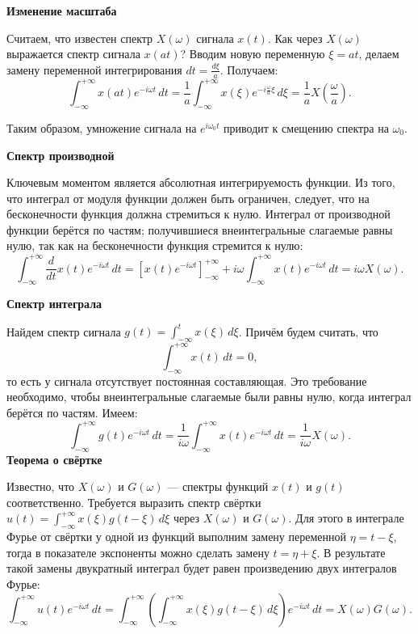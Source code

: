 {\textbf{ Изменение масштаба }

Считаем, что известен спектр \( X(\omega) \) сигнала \( x(t) \). Как через \( X(\omega) \) выражается спектр сигнала \( x(at) \)? Вводим новую переменную \( \xi = at \), делаем замену переменной интегрирования \( dt = \frac{d\xi}{a} \). Получаем:
\[
\int_{-\infty}^{+\infty} x(at) e^{-i \omega t} \, dt = \frac{1}{a} \int_{-\infty}^{+\infty} x(\xi) e^{-i \frac{\omega}{a} \xi} \, d\xi = \frac{1}{a} X\left( \frac{\omega}{a} \right). \tag{2.31}
\]





Таким образом, умножение сигнала на \( e^{i \omega_0 t} \) приводит к смещению спектра на \( \omega_0 \).

\textbf{ Спектр производной }

Ключевым моментом является абсолютная интегрируемость функции. Из того, что интеграл от модуля функции должен быть ограничен, следует, что на бесконечности функция должна стремиться к нулю. Интеграл от производной функции берётся по частям; получившиеся внеинтегральные слагаемые равны нулю, так как на бесконечности функция стремится к нулю:
\[
\int_{-\infty}^{+\infty} \frac{d}{dt} x(t) e^{-i \omega t} \, dt = \left[ x(t) e^{-i \omega t} \right]_{-\infty}^{+\infty} + i \omega \int_{-\infty}^{+\infty} x(t) e^{-i \omega t} \, dt = i \omega X(\omega). \tag{2.32}
\]

\textbf{Спектр интеграла}

Найдем спектр сигнала \( g(t) = \int_{-\infty}^{t} x(\xi) \, d\xi \). Причём будем считать, что
\[
\int_{-\infty}^{+\infty} x(t) \, dt = 0, \tag{2.33}
\]
то есть у сигнала отсутствует постоянная составляющая. Это требование необходимо, чтобы внеинтегральные слагаемые были равны нулю, когда интеграл берётся по частям. Имеем:
\[
\int_{-\infty}^{+\infty} g(t) e^{-i \omega t} \, dt = \frac{1}{i \omega} \int_{-\infty}^{+\infty} x(t) e^{-i \omega t} \, dt = \frac{1}{i \omega} X(\omega).  \tag{2.34}
\]
\newpage 
\textbf{Теорема о свёртке}

Известно, что \( X(\omega) \) и \( G(\omega) \) — спектры функций \( x(t) \) и \( g(t) \) соответственно. Требуется выразить спектр свёртки \( u(t) = \int_{-\infty}^{+\infty} x(\xi) g(t - \xi) \, d\xi \) через \( X(\omega) \) и \( G(\omega) \). Для этого в интеграле Фурье от свёртки у одной из функций выполним замену переменной \( \eta = t - \xi \), тогда в показателе экспоненты можно сделать замену \( t = \eta + \xi \). В результате такой замены двукратный интеграл будет равен произведению двух интегралов Фурье:
\[
\int_{-\infty}^{+\infty} u(t) e^{-i \omega t} \, dt = \int_{-\infty}^{+\infty} \left( \int_{-\infty}^{+\infty} x(\xi) g(t - \xi) \, d\xi \right) e^{-i \omega t} \, dt = X(\omega) G(\omega) \tag{2.35}. 
\]

}
